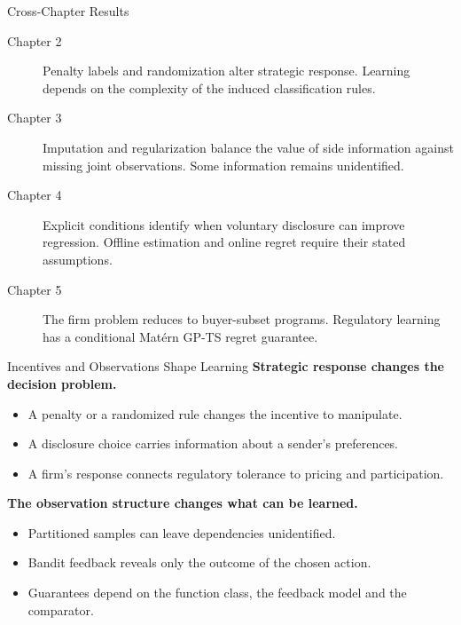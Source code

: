 \documentclass[aspectratio=169, 11pt, t, xcolor=table]{beamer}
\begin{document}
\begin{frame}{Cross-Chapter Results}
\small
\begin{description}
\item[Chapter 2] Penalty labels and randomization alter strategic response.
Learning depends on the complexity of the induced classification rules.
\item[Chapter 3] Imputation and regularization balance the value of side information
against missing joint observations. Some information remains unidentified.
\item[Chapter 4] Explicit conditions identify when voluntary disclosure can improve
regression. Offline estimation and online regret require their stated assumptions.
\item[Chapter 5] The firm problem reduces to buyer-subset programs.
Regulatory learning has a conditional Mat\'ern GP-TS regret guarantee.
\end{description}
\end{frame}

\begin{frame}{Incentives and Observations Shape Learning}
\small
\textbf{Strategic response changes the decision problem.}
\begin{itemize}
\item A penalty or a randomized rule changes the incentive to manipulate.
\item A disclosure choice carries information about a sender's preferences.
\item A firm's response connects regulatory tolerance to pricing and participation.
\end{itemize}
\par\vspace{.8em}
\textbf{The observation structure changes what can be learned.}
\begin{itemize}
\item Partitioned samples can leave dependencies unidentified.
\item Bandit feedback reveals only the outcome of the chosen action.
\item Guarantees depend on the function class, the feedback model and the comparator.
\end{itemize}
\end{frame}
\end{document}
